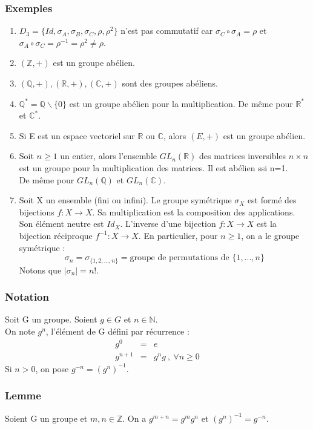 \documentclass[a4paper, oneside]{report}
\newcommand{\x}{\times}
\newcommand{\R}{\mathbb{R}}
\newcommand{\N}{\mathbb{N}}
\newcommand{\C}{\mathbb{C}}
\newcommand{\Z}{\mathbb{Z}}
\newcommand{\Q}{\mathbb{Q}}
\newcommand{\ev}{espace vectoriel }
\begin{document}
\subsubsection{Exemples}
\begin{enumerate}
\item $D_3=\{Id, \sigma_A, \sigma_B, \sigma_C, \rho, \rho^2\}$ n'est pas commutatif car $\sigma_C \circ \sigma_A = \rho$ et $\sigma_A \circ \sigma_C = \rho^{-1} = \rho ^2 \neq \rho$.
\item $(\Z, +)$ est un groupe abélien.
\item $(\Q,+), (\R,+), (\C,+)$ sont des groupes abéliens.
\item $\Q^*=\Q \backslash \{0\}$ est un groupe abélien pour la multiplication. De même pour $\R^*$ et $\C^*$.
\item Si E est un \ev sur $\R$ ou $\C$, alors $(E,+)$ est un groupe abélien.
\item Soit $n\geq 1$ un entier, alors l'ensemble $GL_n(\R)$ des matrices inversibles $n\x n$ est un groupe pour la multiplication des matrices. Il est abélien ssi n=1.\\
De même pour $GL_n(\Q)$ et $GL_n(\C)$.\\
\item Soit X un ensemble (fini ou infini). Le groupe symétrique $\sigma_X$ est formé des bijections $f:X\rightarrow X$. Sa multiplication est la composition des applications. Son élément neutre est $Id_X$. L'inverse d'une bijection $f:X\rightarrow X$ est la bijection réciproque $f^{-1}:X\rightarrow X$. En particulier, pour $n\geq 1$, on a le groupe symétrique :
$$\sigma_n = \sigma_{\{1,2,...,n\}} = \text{groupe de permutations de } \{1,...,n\}$$
Notons que $|\sigma_n|=n!$.
\end{enumerate}

\subsubsection{Notation}
Soit G un groupe. Soient $g\in G$ et $n\in \N$.\\
On note $g^n$, l'élément de G défini par récurrence :
$$\begin{array}{lll}
g^0&=&e\\
g^{n+1}&=&g^ng~,~\forall n \geq 0
\end{array}$$
Si $n>0$, on pose $g^{-n}=(g^n)^{-1}$.

\subsubsection{Lemme}
Soient G un groupe et $m,n\in\Z$. On a $g^{m+n}=g^mg^n$ et $(g^n)^{-1}=g^{-n}$.
\end{document}

